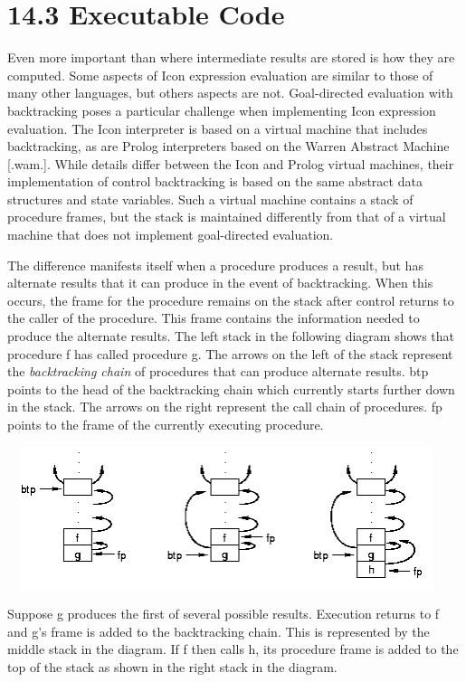 \section[14.3 Executable Code]{14.3 Executable Code}

Even more important than where intermediate results are stored is how
they are computed. Some aspects of Icon expression evaluation are
similar to those of many other languages, but others aspects are
not. Goal-directed evaluation with backtracking poses a particular
challenge when implementing Icon expression evaluation. The Icon
interpreter is based on a virtual machine that includes backtracking,
as are Prolog interpreters based on the Warren Abstract Machine
[.wam.]. While details differ between the Icon and Prolog virtual
machines, their implementation of control backtracking is based on the
same abstract data structures and state variables. Such a virtual
machine contains a stack of procedure frames, but the stack is
maintained differently from that of a virtual machine that does not
implement goal-directed evaluation.

The difference manifests itself when a procedure produces a result,
but has alternate results that it can produce in the event of
backtracking. When this occurs, the frame for the procedure remains on
the stack after control returns to the caller of the procedure. This
frame contains the information needed to produce the alternate
results. The left stack in the following diagram shows that procedure
f has called procedure g. The arrows on the left of the stack
represent the \textit{backtracking chain} of procedures that can
produce alternate results. btp points to the head of the backtracking
chain which currently starts further down in the stack. The arrows on
the right represent the call chain of procedures. fp points to the
frame of the currently executing procedure.

{\centering{}
 \includegraphics[width=5.0319in,height=1.6346in]{kw/figure2-1.png}  
\par}


Suppose g produces the first of several possible results. Execution
returns to f and g's frame is added to the backtracking chain. This is
represented by the middle stack in the diagram. If f then calls h, its
procedure frame is added to the top of the stack as shown in the right
stack in the diagram.

